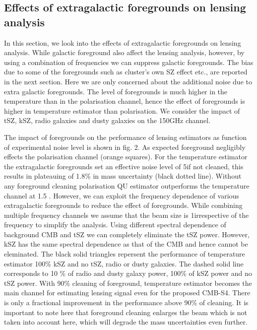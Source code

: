    \subsection{Effects of extragalactic foregrounds on lensing analysis}
   In this section, we look into the effects of extragalactic foregrounds on lensing analysis. While galactic foreground also affect the lensing analysis, however, by using a combination of frequencies we can suppress galactic foregrounds. The bias due to some of the foregrounds such as cluster's own SZ effect etc., are reported in the next section. Here we are only concerned about the additional noise due to extra galactic foregrounds. The level of foregrounds is much higher in the temperature than in the polarisation channel, hence the effect of foregrounds is higher in temperature estimator than polarisation. We consider the impact of tSZ, kSZ, radio galaxies and dusty galaxies on the 150GHz channel.
   
   The impact of foregrounds on the performance of lensing estimators as function of experimental noise level is shown in fig. 2. 
   As expected foreground negligibly effects the polarisation channel (orange squares).
   For the temperature estimator the extragalactic foregrounds set an effective noise level of 5\ukam if not cleaned, this results in plateauing of 1.8\% in mass uncertainty (black dotted line). 
   Without any foreground cleaning polarisation QU estimator outperforms the temperature channel at 1.5 \ukam.
 However, we can exploit the frequency dependence of various extragalactic foregrounds to reduce the effect of foregrounds.
 While combining multiple frequency channels we assume that the beam size is 1\am  irrespective of the frequency to simplify the analysis. 
Using different spectral dependence of background CMB and tSZ we can completely eliminate the tSZ power.
 However, kSZ has the same spectral dependence as that of the CMB and hence cannot be eleminated. 
 The black solid triangles repersent the performance of temperature estimator 100\% kSZ and no tSZ, radio or dusty galaxies.
 The dashed solid line corresponds to 10 \% of radio and dusty galaxy power, 100\% of kSZ power and no tSZ power. 
 With 90\% cleaning of foreground, temperature estimator becomes the main channel for estimating lensing signal even for the proposed CMB-S4.
  There is only a fractional improvement in the performance above 90\% of cleaning. 
  It is important to note here that foreground cleaning enlarges the beam which is not taken into account here, which will degrade the mass uncertainties even further.
  
